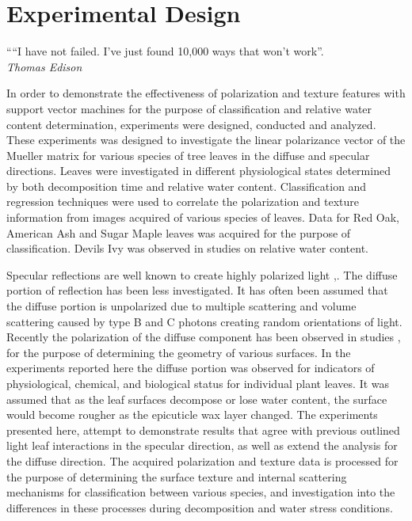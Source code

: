 \chapter{Experimental Design}
\begin{center}
  \begin{minipage}{0.75\textwidth}
    \begin{small}
      ““I have not failed. I've just found 10,000 ways that won't work”.\\
      \null\hfill\emph{Thomas Edison}
    \end{small}
  \end{minipage}
  \vspace{0.5cm}
\end{center}

In order to demonstrate the effectiveness of polarization and texture features with support vector machines for the purpose of classification and relative water content determination, experiments were designed, conducted and analyzed. These experiments was designed to investigate the linear polarizance vector of the Mueller matrix for various species of tree leaves in the diffuse and specular directions.  Leaves were investigated in different physiological states determined by both decomposition time and relative water content.  Classification and regression techniques were used to correlate the polarization and texture information from images acquired of various species of leaves.  Data for Red Oak, American Ash and Sugar Maple leaves was acquired for the purpose of classification.  Devils Ivy was observed in studies on relative water content.

Specular reflections are well known to create highly polarized light \cite{grant},\cite{vanderbilt}. The diffuse portion of reflection has been less investigated.  It has often been assumed that the diffuse portion is unpolarized due to multiple scattering and volume scattering caused by type B and C photons creating random orientations of light.  Recently the polarization of the diffuse component has been observed in studies \cite{surface}, \cite{shapediffuse} for the purpose of determining the geometry of various surfaces.  In the experiments reported here the diffuse portion was observed for indicators of physiological, chemical, and biological status for individual plant leaves. It was assumed that as the leaf surfaces decompose or lose water content, the surface would become rougher as the epicuticle wax layer changed. The experiments presented here, attempt to demonstrate results that agree with previous outlined light leaf interactions in the specular direction, as well as extend the analysis for the diffuse direction.  The acquired polarization and texture data is processed for the purpose of determining the surface texture and internal scattering mechanisms for classification between various species, and investigation into the differences in these processes during decomposition and water stress conditions.

